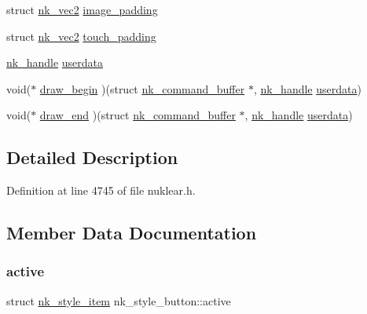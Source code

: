 \begin{DoxyCompactItemize}
struct \mbox{\hyperlink{structnk__vec2}{nk\+\_\+vec2}} \mbox{\hyperlink{structnk__style__button_ab53cdca97ddb24dea561e1cec88b3ba2}{image\+\_\+padding}}
\item 
struct \mbox{\hyperlink{structnk__vec2}{nk\+\_\+vec2}} \mbox{\hyperlink{structnk__style__button_a70e4b8b7bc59f9b06e477c003bfab855}{touch\+\_\+padding}}
\item 
\mbox{\hyperlink{unionnk__handle}{nk\+\_\+handle}} \mbox{\hyperlink{structnk__style__button_a486c8383bd02dae018cacaa370bf0c43}{userdata}}
\item 
void($\ast$ \mbox{\hyperlink{structnk__style__button_a802641ef81a16f9d78c4a6758a3109b6}{draw\+\_\+begin}} )(struct \mbox{\hyperlink{structnk__command__buffer}{nk\+\_\+command\+\_\+buffer}} $\ast$, \mbox{\hyperlink{unionnk__handle}{nk\+\_\+handle}} \mbox{\hyperlink{structnk__style__button_a486c8383bd02dae018cacaa370bf0c43}{userdata}})
\item 
void($\ast$ \mbox{\hyperlink{structnk__style__button_a10cbc466ee1819b82fa19867095141a1}{draw\+\_\+end}} )(struct \mbox{\hyperlink{structnk__command__buffer}{nk\+\_\+command\+\_\+buffer}} $\ast$, \mbox{\hyperlink{unionnk__handle}{nk\+\_\+handle}} \mbox{\hyperlink{structnk__style__button_a486c8383bd02dae018cacaa370bf0c43}{userdata}})
\end{DoxyCompactItemize}


\subsection{Detailed Description}


Definition at line 4745 of file nuklear.\+h.



\subsection{Member Data Documentation}
\mbox{\label{structnk__style__button_a69e536c30da388a84eed8f605e860129}} 
\subsubsection{\texorpdfstring{active}{active}}
{\footnotesize\ttfamily struct \mbox{\hyperlink{structnk__style__item}{nk\+\_\+style\+\_\+item}} nk\+\_\+style\+\_\+button\+::active}



